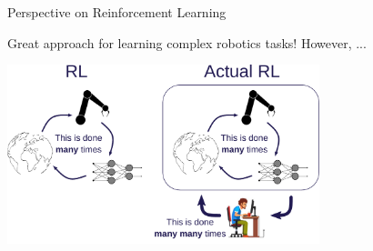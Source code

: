 \begin{frame}{Perspective on Reinforcement Learning}{}
    \centering
    \begin{block}{Great approach for learning complex robotics tasks! However, ...}\end{block}

    \vspace{0.2cm}

    \includegraphics[height=5.2cm]{graphics/actual_rl.pdf}
\end{frame}
